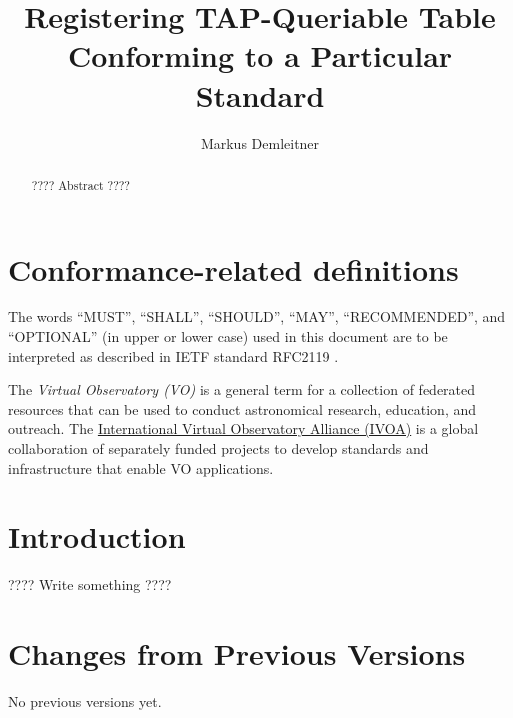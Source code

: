 \documentclass[11pt,a4paper]{ivoa}
\title{Registering TAP-Queriable Table Conforming to a Particular
Standard}
\author[http://www.ivoa.net/cgi-bin/twiki/bin/view/IVOA/MarkusDemleitner]{Markus Demleitner}
\begin{document}
\begin{abstract}
???? Abstract ????
\end{abstract}


\section*{Conformance-related definitions}

The words ``MUST'', ``SHALL'', ``SHOULD'', ``MAY'', ``RECOMMENDED'', and
``OPTIONAL'' (in upper or lower case) used in this document are to be
interpreted as described in IETF standard RFC2119 \citep{std:RFC2119}.

The \emph{Virtual Observatory (VO)} is a
general term for a collection of federated resources that can be used
to conduct astronomical research, education, and outreach.
The \href{https://www.ivoa.net}{International
Virtual Observatory Alliance (IVOA)} is a global
collaboration of separately funded projects to develop standards and
infrastructure that enable VO applications.


\section{Introduction}

???? Write something ????


\appendix
\section{Changes from Previous Versions}

No previous versions yet.



\end{document}
